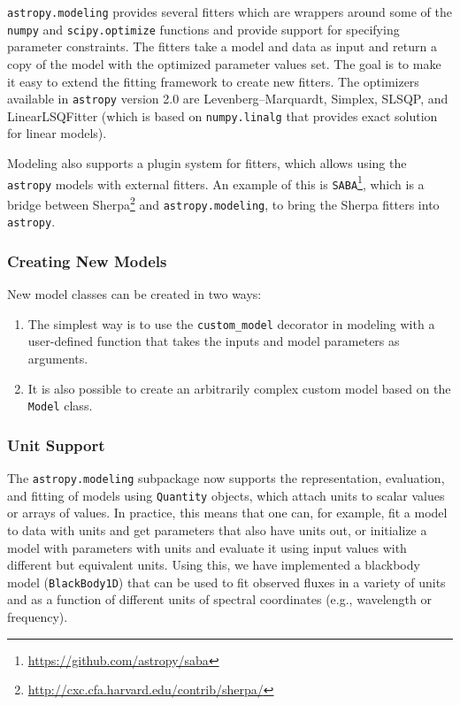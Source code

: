 \documentclass[modern]{aastex61}
\newcommand{\package}[1]{\texttt{#1}\xspace}
\newcommand{\astropypkg}{\package{astropy}}
\newcommand{\inlinecomment}[2]{\todo[inline]{#1: #2}\xspace}
\begin{document}
\package{astropy.modeling} provides several fitters which are wrappers around some of the \texttt{numpy} and \texttt{scipy.optimize} functions and provide support for specifying parameter constraints. The fitters take a model and data as input and return a copy of the model with the optimized parameter values set. The goal is to make it easy to extend the fitting framework to create new fitters. The optimizers available in \astropypkg version 2.0 are Levenberg--Marquardt, Simplex, SLSQP, and LinearLSQFitter (which is based on \texttt{numpy.linalg} that provides exact solution for linear models).


Modeling also supports a plugin system for fitters, which allows using the
\astropypkg models with external fitters. An example of this is
\package{SABA}\footnote{\url{https://github.com/astropy/saba}}, which is a bridge between
Sherpa\footnote{\url{http://cxc.cfa.harvard.edu/contrib/sherpa/}}
and \package{astropy.modeling}, to bring the Sherpa fitters into \astropypkg.

\subsubsection{Creating New Models}

New model classes can be created in two ways:
\begin{enumerate}
   \item The simplest way is to use the \texttt{custom\_model} decorator in modeling with a user-defined function that takes the inputs and model parameters as arguments.
   \item It is also possible to create an arbitrarily complex custom model based on the \texttt{Model} class.
\end{enumerate}

\subsubsection{Unit Support}

The \package{astropy.modeling} subpackage now supports the representation, evaluation, and fitting of models using \texttt{Quantity} objects, which attach units to scalar values or arrays of values. In practice, this means that one can, for example, fit a model to data with units and get parameters that also have units out, or initialize a model with parameters with units and evaluate it using input values with different but equivalent units. Using this, we have implemented a blackbody model (\texttt{BlackBody1D}) that can be used to fit observed fluxes in a variety of units and as a function of different units of spectral coordinates (e.g., wavelength or frequency).
\end{document}
